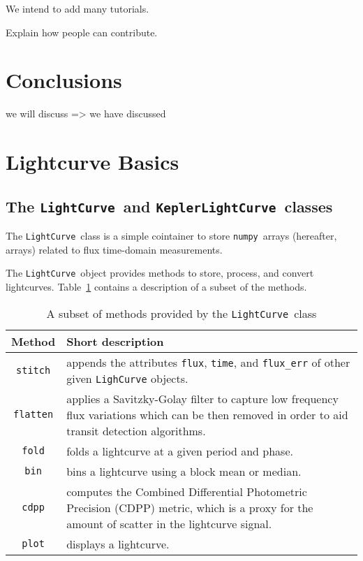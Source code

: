 \documentclass[twocolumn]{aastex62}
\newcommand{\LightCurve}{\texttt{LightCurve}}
\newcommand{\KeplerLightCurve}{\texttt{KeplerLightCurve}}
\newcommand{\numpy}{\texttt{numpy}}
\begin{document}
We intend to add many tutorials.

Explain how people can contribute.


\section{Conclusions}

we will discuss => we have discussed


\section{Lightcurve Basics}

\subsection{The \LightCurve~and \KeplerLightCurve~classes}
        The \LightCurve~class is a simple cointainer to store \numpy~arrays
        (hereafter, arrays) related to flux time-domain measurements.

        The \LightCurve~object provides methods to store, process, and
        convert lightcurves. Table~\ref{tab:methods} contains a description
        of a subset of the methods.

        \begin{table}[!htb]
            \centering
            \caption{A subset of methods provided by the \LightCurve~class}
            \begin{tabular}{cp{6.5cm}}
                \hline
                \textbf{Method} & \textbf{Short description} \\
                \hline
                \texttt{stitch} & appends the attributes \texttt{flux},
                \texttt{time}, and \texttt{flux\_err} of other given
                \texttt{LighCurve} objects.\\
                \texttt{flatten} & applies a Savitzky-Golay filter to capture
                low frequency flux variations which can be then removed in order
                to aid transit detection algorithms.\\
                \texttt{fold} & folds a lightcurve at a given period and phase.\\
                \texttt{bin} &  bins a lightcurve using a block mean or median.\\
                \texttt{cdpp} &  computes the Combined Differential Photometric
                Precision (CDPP) metric, which is a proxy for the amount of
                scatter in the lightcurve signal. \\
                \texttt{plot} & displays a lightcurve.
            \end{tabular}
            \label{tab:methods}
        \end{table}
\end{document}
